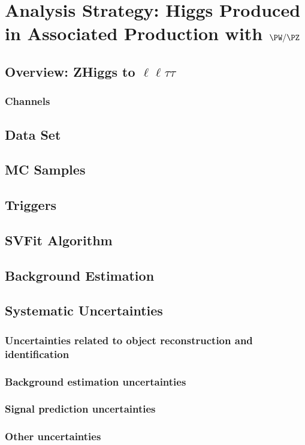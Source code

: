 \chapter{Analysis Strategy: Higgs Produced in Associated Production with $\PW/\PZ$}
\label{sec:vh_analysis}

\section{Overview: ZHiggs to $\ell\ell\tau\tau$}
\subsection{Channels}
\section{Data Set}
\section{MC Samples}
\section{Triggers}
\section{SVFit Algorithm}
\section{Background Estimation}
\section{Systematic Uncertainties}
\subsection{Uncertainties related to object reconstruction and identification}
\subsection{Background estimation uncertainties}
\subsection{Signal prediction uncertainties}
\subsection{Other uncertainties}
